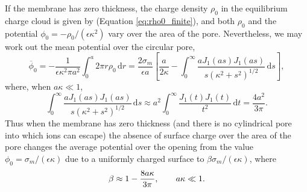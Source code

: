 If the membrane has zero thickness,
the charge density $\rho_0$ in the equilibrium charge cloud is
given by (Equation \ref{eq:rho0_finite}), and
both $\rho_0$ and the potential $\phi_0=-\rho_0/(\epsilon\kappa^2)$
vary over the area of the pore. Nevertheless, we may work out the mean potential
over the circular pore,
\begin{equation}
\overline{\phi}_0=-\frac{1}{\epsilon\kappa^2\pi a^2}
\int_0^a 2\pi r\rho_0\,\text{d}r
=\frac{2\sigma_m}{\epsilon a}
\left\lbrack\frac{a}{2\kappa}-
 \int_0^\infty
\frac{aJ_1(as)J_1(as)}{s(\kappa^2+s^2)^{1/2}}\,\text{d}s
 \right\rbrack,
\end{equation}
where, when $a\kappa\ll 1$,
\begin{equation}
\int_0^\infty
\frac{aJ_1(as)J_1(as)}{s(\kappa^2+s^2)^{1/2}}\,\text{d}s
\approx a^2\int_0^\infty
\frac{J_1(t)J_1(t)}{t^2}\,\text{d}t
=\frac{4a^2}{3\pi}.
\end{equation}
Thus when the membrane has zero thickness (and there is no
cylindrical pore into which ions can escape)
the absence of surface charge over
the area of the pore
changes the average potential over the opening from 
the value
$\phi_0=\sigma_m/(\epsilon\kappa)$ due to a uniformly charged surface
to $\beta\sigma_m/(\epsilon\kappa)$, where
\begin{equation}
\beta\approx 1-\frac{8a\kappa}{3\pi},\hskip 20pt a\kappa \ll 1.
\label{beta_defn}
\end{equation}


